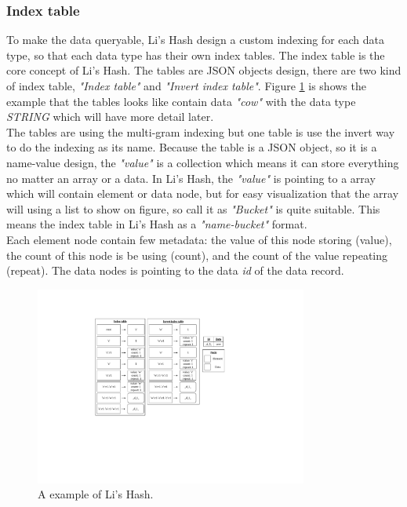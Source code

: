 \clearpage

\subsubsection{Index table}

To make the data queryable, Li's Hash design a custom indexing for each data type, so that each data type has their own index tables. The index table is the core concept of Li's Hash. The tables are JSON objects design, there are two kind of index table, \textit{"Index table"} and \textit{"Invert index table"}. Figure \ref{fig:algorithm:lishash_example} is shows the example that the tables looks like contain data \textit{"cow"} with the data type \textit{STRING} which will have more detail later.\\

The tables are using the multi-gram indexing but one table is use the invert way to do the indexing as its name. Because the table is a JSON object, so it is a name-value design, the \textit{"value"} is a collection which means it can store everything no matter an array or a data. In Li's Hash, the \textit{"value"} is pointing to a array which will contain element or data node, but for easy visualization that the array will using a list to show on figure, so call it as \textit{"Bucket"} is quite suitable. This means the index table in Li's Hash as a \textit{"name-bucket"} format.\\

Each element node contain few metadata: the value of this node storing (value), the count of this node is be using (count), and the count of the value repeating (repeat). The data nodes is pointing to the data \textit{id} of the data record.

\begin{figure}[h]
\centering
\includegraphics[width=0.8\textwidth]{./algorithm/pic/index_table/table_format_v13.pdf}
\caption{A example of Li's Hash.}
\label{fig:algorithm:lishash_example}
\end{figure}

